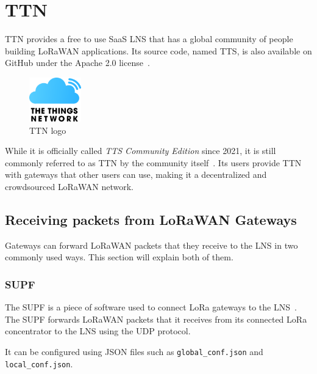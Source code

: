 \section{\acf{TTN}}

\ac{TTN} provides a free to use \ac{SaaS} \ac{LNS} that has a global community of people building \ac{LoRaWAN} applications.
Its source code, named \ac{TTS}, is also available on GitHub under the Apache 2.0 license~\cite{the_things_network_thethingsnetworklorawan-stack_2023}.

\begin{figure}[htbp]
    \centering
    \includegraphics[width=0.2\textwidth]{pictures/logos/TTN-logo.eps}
    \caption{\acf{TTN} logo~\protect\cite{the_things_industries_bv_quick_nodate}}
\end{figure}


While it is officially called \emph{\acl{TTS} Community Edition} since 2021, it is still commonly referred to as \acf{TTN} by the community itself~\cite{the_things_industries_bv_what_2022}.
Its users provide \ac{TTN} with gateways that other users can use, making it a decentralized and crowdsourced \ac{LoRaWAN} network.

\subsection{Receiving packets from \acs{LoRaWAN} Gateways}

Gateways can forward \ac{LoRaWAN} packets that they receive to the \ac{LNS} in two commonly used ways.
This section will explain both of them.

\subsubsection{\acf{SUPF}}

The \ac{SUPF} is a piece of software used to connect \ac{LoRa} gateways to the \ac{LNS}~\cite{the_things_industries_bv_semtech_2022}.
The \ac{SUPF} forwards \ac{LoRaWAN} packets that it receives from its connected \ac{LoRa} concentrator to the \ac{LNS} using the \ac{UDP} protocol.

It can be configured using JSON files such as \lstinline{global_conf.json} and \lstinline{local_conf.json}.

